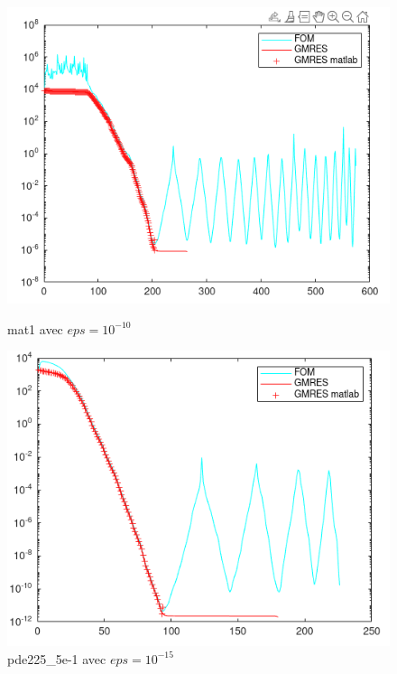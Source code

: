 \documentclass[12pt,a4paper]{article}
\begin{document}
\begin{figure}[H]
    \centering
    \begin{minipage}{0.45\textwidth}
        \centering
        \includegraphics[width=\textwidth]{src/mat1_10.png}
        \caption{mat1 avec $eps=10^{-10}$}
    \end{minipage}
    \hfill
    \begin{minipage}{0.45\textwidth}
        \centering
        \includegraphics[width=\textwidth]{src/pde_15.png}
        \caption{pde225\_5e-1 avec $eps=10^{-15}$}
    \end{minipage}
    \hfill
    \begin{minipage}{0.45\textwidth}

\end{minipage}
\end{figure}
\end{document}
